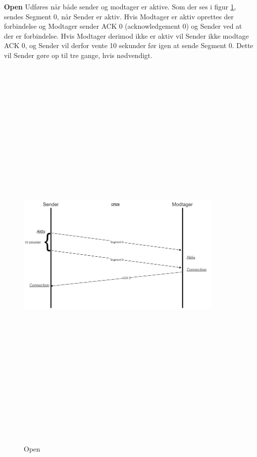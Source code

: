 \textbf{Open} %
\newline
Udføres når både sender og modtager er aktive.
\newline
Som der ses i figur \ref{fig:open}, sendes Segment 0, når Sender er aktiv. Hvis Modtager er aktiv oprettes der forbindelse og Modtager sender ACK 0 (acknowledgement 0) og Sender ved at der er forbindelse.
\newline
Hvis Modtager derimod ikke er aktiv vil Sender ikke modtage ACK 0, og Sender vil derfor vente 10 sekunder før igen at sende Segment 0. Dette vil Sender gøre op til tre gange, hvis nødvendigt.
\begin{figure}[ht]
	\centering
	\includegraphics[width=10cm,height=20cm,keepaspectratio]{pictures/Open.png}
	\caption{Open}
	\label{fig:open}
\end{figure}

